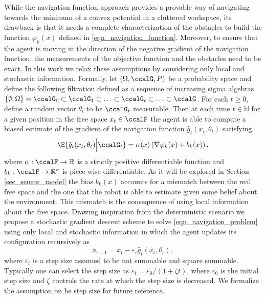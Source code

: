 \documentclass[article]{IEEEtran}
\theoremstyle{definition}
\begin{document}
While the navigation function approach provides a provable way of navigating towards the minimum of a convex potential in a cluttered workspace, its drawback is that it needs a complete characterization of the obstacles to build the function $\varphi_k(x)$ defined in \eqref{eqn_navigation_function}. Moreover, to ensure that the agent is moving in the direction of the negative gradient of the navigation function, the measurements of the objective function and the obstacles need to be exact. In this work we relax these assumptions by considering only local and stochastic information. Formally, let $\left( \Omega,\ccalG, P\right)$ be a probability space and define the following filtration defined as a sequence of increasing sigma algebras $\left\{\emptyset, \Omega\right\} = \ccalG_0 \subset \ccalG_1 \subset \ldots \subset \ccalG_t \subset \ldots \subset \ccalG$. For each $t \geq 0$, define a random vector $\theta_t $ to be $\ccalG_t$ measurable. Then at each time $t\in\mathbb{N}$ for a given position in the free space $x_t \in \ccalF$ the agent is able to compute a biased estimate of the gradient of the navigation function $\hat{g}_t(x_t,\theta_t)$ satisfying
%
\begin{equation}\label{eqn_estimate_form}
\E{\hat{g}_t(x_t,\theta_t)\Big| \ccalG_t} = \alpha(x)\left(\nabla \varphi_k(x)+b_k(x)\right),
\end{equation}
%
where $\alpha:\ccalF \to \mathbb{R}$ is a strictly positive differentiable function and $b_k:\ccalF \to \mathbb{R}^n$ is piece-wise differentiable. As it will be explored in Section \ref{sec_sensor_model} the bias $b_k(x)$ accounts for a mismatch between the real free space and the one that the robot is able to estimate given some belief about the environment. This mismatch is the consequence of using local information about the free space. Drawing inspiration from the deterministic scenario we propose a stochastic gradient descent scheme to solve \eqref{eqn_navigation_problem} using only local and stochastic information in which the agent updates its configuration recursively as
%
\begin{equation}\label{eqn_gradient_descent}
x_{t+1} = x_t - \varepsilon_t \hat{g}_t(x_t,\theta_t),
\end{equation}
where $\varepsilon_t$ is a step size assumed to be not summable and square summable. Typically one can select the step size as $\varepsilon_t = \varepsilon_0/ (1+\zeta t)$, where $\varepsilon_0$ is the initial step size and $\zeta$ controls the rate at which the step size is decreased. We formalize the assumption on he step size for future reference. 
\end{document}
